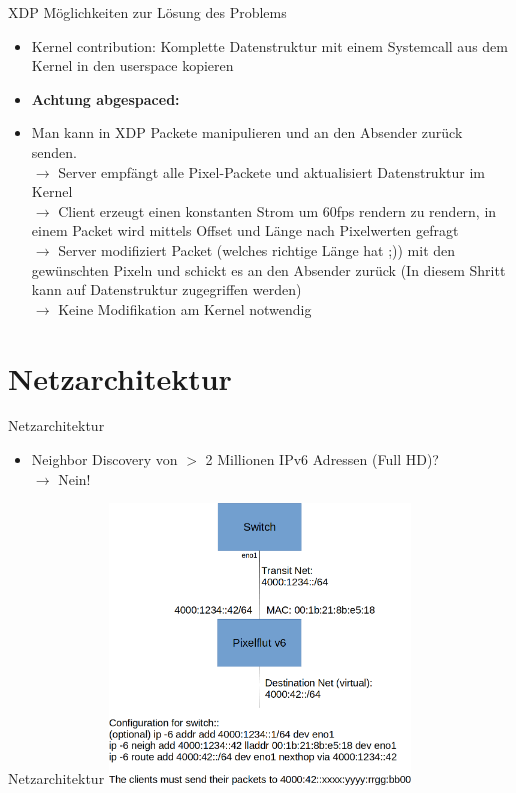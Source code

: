 \documentclass[12pt,donthandout,notes=dontshow,xcolor=table]{beamer}
\begin{document}
\begin{frame}{XDP}
	Möglichkeiten zur Lösung des Problems
	\begin{itemize}
		\item Kernel contribution: Komplette Datenstruktur mit einem Systemcall aus dem Kernel in den userspace kopieren
		\pause
		\item \textbf{Achtung abgespaced:}
		\pause
		\item Man kann in XDP Packete manipulieren und an den Absender zurück senden.\\
		$\rightarrow$ Server empfängt alle Pixel-Packete und aktualisiert Datenstruktur im Kernel\\
		$\rightarrow$ Client erzeugt einen konstanten Strom um 60fps rendern zu rendern, in einem Packet wird mittels Offset und Länge nach Pixelwerten gefragt\\
		$\rightarrow$ Server modifiziert Packet (welches richtige Länge hat ;)) mit den gewünschten Pixeln und schickt es an den Absender zurück (In diesem Shritt kann auf Datenstruktur zugegriffen werden)\\
		$\rightarrow$ Keine Modifikation am Kernel notwendig
	\end{itemize}
\end{frame}

\section{Netzarchitektur}
\begin{frame}{Netzarchitektur}
	\begin{itemize}
		\item Neighbor Discovery von $>$ 2 Millionen IPv6 Adressen (Full HD)?\\
		\pause
		$\rightarrow$ Nein!
	\end{itemize}
\end{frame}

\begin{frame}{Netzarchitektur}
\includegraphics[width=8cm]{figures/network_structure_cut}
\end{frame}
\end{document}
